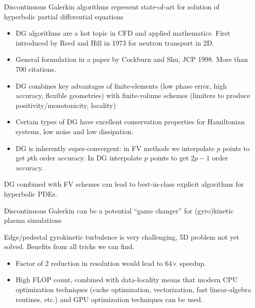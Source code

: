\documentclass[pdf]{beamer}
\newcommand{\mypause}{}
\theoremstyle{definition}
\begin{document}
\begin{frame}{Discontinuous Galerkin algorithms represent state-of-art
    for solution of hyperbolic partial differential equations}
  \begin{itemize}
    \small
  \item DG algorithms are a hot topic in CFD and applied
    mathematics. First introduced by Reed and Hill in 1973 for neutron
    transport in 2D.
    \mypause
  \item General formulation in a paper by Cockburn and Shu, JCP
    1998. More than 700 citations.  \mypause
  \item DG combines key advantages of finite-elements (low phase
    error, high accuracy, flexible geometries) with finite-volume
    schemes (limiters to produce positivity/monotonicity, locality)
    \mypause
  \item Certain types of DG have excellent conservation properties for
    Hamiltonian systems, low noise and low dissipation.
    \mypause
  \item DG is inherently super-convergent: in FV methods we
    interpolate $p$ points to get $p$th order accuracy. In DG
    interpolate $p$ points to get $2p-1$ order accuracy.
  \end{itemize}
  DG combined with FV schemes can lead to best-in-class explicit
  algorithms for hyperbolic PDEs.

\end{frame}

\begin{frame}{Discontinuous Galerkin can be a potential ``game
    changer'' for (gyro)kinetic plasma simulations}
  
  Edge/pedestal gyrokinetic turbulence is very challenging, 5D problem
  not yet solved. Benefits from all tricks we can find.
  \begin{itemize}
  \item Factor of 2 reduction in resolution would lead to 64$\times$
    speedup.
  \item High FLOP count, combined with data-locality means that modern
    CPU optimization techniques (cache optimization, vectorization,
    fast linear-algebra routines, etc.) and GPU optimization
    techniques can be used.
  \end{itemize}

\end{frame}
\end{document}
